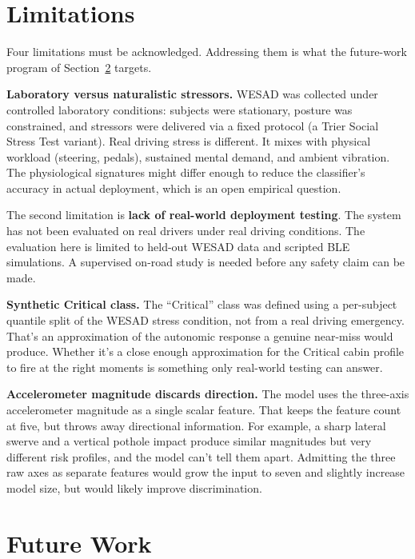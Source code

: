 \section{Limitations}
\label{sec:conclusion-limits}

Four limitations must be acknowledged. Addressing them is what the
future-work program of Section~\ref{sec:conclusion-future} targets.

\textbf{Laboratory versus naturalistic stressors.} WESAD
\citep{schmidt2018wesad} was collected under controlled laboratory
conditions: subjects were stationary, posture was constrained, and
stressors were delivered via a fixed protocol (a Trier Social Stress
Test variant). Real driving stress is different. It mixes with
physical workload (steering, pedals), sustained mental demand, and
ambient vibration. The physiological signatures might differ enough
to reduce the classifier's accuracy in actual deployment, which is
an open empirical question.

The second limitation is \textbf{lack of real-world deployment testing}.
The system has not been evaluated on real drivers under real driving
conditions. The evaluation here is limited to held-out WESAD data and
scripted BLE simulations. A supervised on-road study is needed before
any safety claim can be made.

\textbf{Synthetic Critical class.} The ``Critical'' class was defined
using a per-subject quantile split of the WESAD stress condition, not
from a real driving emergency. That's an approximation of the autonomic
response a genuine near-miss would produce. Whether it's a close enough
approximation for the Critical cabin profile to fire at the right
moments is something only real-world testing can answer.

\textbf{Accelerometer magnitude discards direction.} The model uses
the three-axis accelerometer magnitude as a single scalar feature.
That keeps the feature count at five, but throws away directional
information. For example, a sharp lateral swerve and a vertical
pothole impact produce similar magnitudes but very different risk
profiles, and the model can't tell them apart. Admitting the three
raw axes as separate features would grow the input to seven and
slightly increase model size, but would likely improve discrimination.

\section{Future Work}
\label{sec:conclusion-future}

